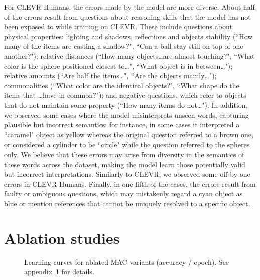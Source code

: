 \documentclass[fleqn]{article}
\newcommand{\appref}[1]{appendix~\ref{sec:#1}}
\begin{document}
For CLEVR-Humans, the errors made by the model are more diverse. About half of the errors result from questions about reasoning skills that the model has not been exposed to while training on CLEVR. These include questions about physical properties: lighting and shadows, reflections and objects stability (``How many of the items are casting a shadow?", ``Can a ball stay still on top of one another?"); relative distances (``How many objects\ldots are almost touching?", ``What color is the sphere positioned closest to\ldots", ``What object is in between\ldots"); relative amounts (``Are half the items\ldots", ``Are the objects mainly\ldots"); commonalities (``What color are the identical objects?", ``What shape do the items that \ldots have in common?"); and negative questions, which refer to objects that do not maintain some property (``How many items do not\ldots"). In addition, we observed some cases where the model misinterprets unseen words, capturing plausible but incorrect semantics: for instance, in some cases it interpreted a ``caramel" object as yellow whereas the original question referred to a brown one, or considered a cylinder to be ``circle" while the question referred to the spheres only. We believe that these errors may arise from diversity in the semantics of these words across the dataset, making the model learn those potentially valid but incorrect interpretations. Similarly to CLEVR, we observed some off-by-one errors in CLEVR-Humans. Finally, in one fifth of the cases, the errors result from faulty or ambiguous questions, which may mistakenly regard a cyan object as blue or mention references that cannot be uniquely resolved to a specific object.

\section{Ablation studies}
\label{sec:ablationsSupp} 

\begin{figure}[t]
\centering
{}
\hfill
{}
\hfill
{}
\hfill
{}
\hfill
{}
\caption{Learning curves for ablated MAC variants (accuracy / epoch). See \appref{ablationsSupp} for details.}
\label{fig:ablationsSupp}
\end{figure}
\end{document}
